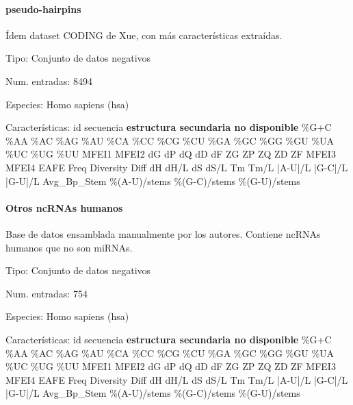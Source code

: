 \documentclass[12pt,bibliography=openstyle,DIV=12,parskip=half-]{scrartcl}
\begin{document}
\paragraph{pseudo-hairpins}
Ídem dataset CODING de Xue, con más características extraídas.
\begin{description*}
\item[Tipo:] Conjunto de datos negativos
\item[Num. entradas:] 8494
\item[Especies:] Homo sapiens (hsa)
\item[Características:]
id \quad secuencia \quad \textbf{estructura secundaria no disponible}
\quad \%G+C \quad \%AA \quad \%AC \quad \%AG \quad \%AU \quad \%CA
\quad \%CC \quad \%CG \quad \%CU \quad \%GA \quad \%GC \quad \%GG
\quad \%GU \quad \%UA \quad \%UC \quad \%UG \quad \%UU \quad MFEI1
\quad MFEI2 \quad dG \quad dP \quad dQ \quad dD \quad dF \quad ZG
\quad ZP \quad ZQ \quad ZD \quad ZF \quad MFEI3 \quad MFEI4 \quad EAFE
\quad Freq \quad Diversity \quad Diff \quad dH \quad dH/L \quad dS
\quad dS/L \quad Tm \quad Tm/L \quad |A-U|/L \quad |G-C|/L \quad
|G-U|/L \quad Avg\_Bp\_Stem \quad \%(A-U)/stems \quad \%(G-C)/stems
\quad \%(G-U)/stems
\end{description*}



\paragraph{Otros ncRNAs humanos}
Base de datos ensamblada manualmente por los autores. Contiene ncRNAs humanos
que no son miRNAs.
\begin{description*}
\item[Tipo:] Conjunto de datos negativos
\item[Num. entradas:] 754
\item[Especies:] Homo sapiens (hsa)
\item[Características:]
id \quad secuencia \quad \textbf{estructura secundaria no disponible}
\quad \%G+C \quad \%AA \quad \%AC \quad \%AG \quad \%AU \quad \%CA
\quad \%CC \quad \%CG \quad \%CU \quad \%GA \quad \%GC \quad \%GG
\quad \%GU \quad \%UA \quad \%UC \quad \%UG \quad \%UU \quad MFEI1
\quad MFEI2 \quad dG \quad dP \quad dQ \quad dD \quad dF \quad ZG
\quad ZP \quad ZQ \quad ZD \quad ZF \quad MFEI3 \quad MFEI4 \quad EAFE
\quad Freq \quad Diversity \quad Diff \quad dH \quad dH/L \quad dS
\quad dS/L \quad Tm \quad Tm/L \quad |A-U|/L \quad |G-C|/L \quad
|G-U|/L \quad Avg\_Bp\_Stem \quad \%(A-U)/stems \quad \%(G-C)/stems
\quad \%(G-U)/stems
\end{description*}
\end{document}
